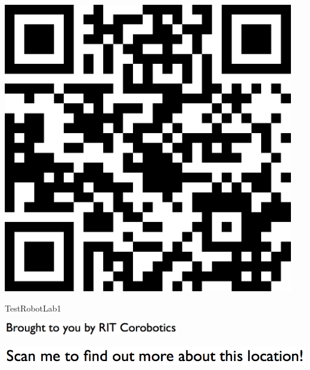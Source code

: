 \documentclass[letterpaper]{article}
\begin{document}
 \begingroup 
 \centerline{\includegraphics[scale=1,width=5in,height=5in]{TestRobotLab1.png}} 
 \endgroup 
 \vspace*{\fill} 

 \hfill{\small TestRobotLab1} 

  \vspace{0.7in} 
 
 \centerline{\includegraphics[scale=1,width=3in]{text-bottom.png}} 
 
 \pagebreak 
{} 
 \vspace*{\fill} 
 
  \centerline{\includegraphics[scale=1,width=6in]{text-top.png}} 
 
 \vspace{0.5in} 
 
\end{document}
